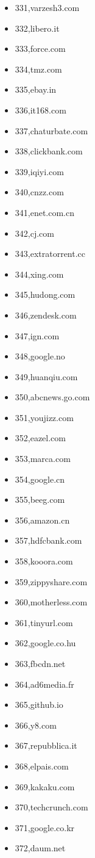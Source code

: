 \begin{multicols}{3}
\begin{itemize}
	\item 331,varzesh3.com
	\item 332,libero.it
	\item 333,force.com
	\item 334,tmz.com
	\item 335,ebay.in
	\item 336,it168.com
	\item 337,chaturbate.com
	\item 338,clickbank.com
	\item 339,iqiyi.com
	\item 340,cnzz.com
	\item 341,enet.com.cn
	\item 342,cj.com
	\item 343,extratorrent.cc
	\item 344,xing.com
	\item 345,hudong.com
	\item 346,zendesk.com
	\item 347,ign.com
	\item 348,google.no
	\item 349,huanqiu.com
	\item 350,abcnews.go.com
	\item 351,youjizz.com
	\item 352,eazel.com
	\item 353,marca.com
	\item 354,google.cn
	\item 355,beeg.com
	\item 356,amazon.cn
	\item 357,hdfcbank.com
	\item 358,kooora.com
	\item 359,zippyshare.com
	\item 360,motherless.com
	\item 361,tinyurl.com
	\item 362,google.co.hu
	\item 363,fbcdn.net
	\item 364,ad6media.fr
	\item 365,github.io
	\item 366,y8.com
	\item 367,repubblica.it
	\item 368,elpais.com
	\item 369,kakaku.com
	\item 370,techcrunch.com
	\item 371,google.co.kr
	\item 372,daum.net

\end{itemize}
\end{multicols}
